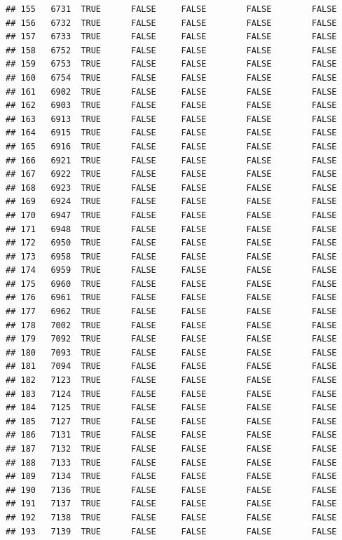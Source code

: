 \documentclass[
  10pt,
  b5paper,
  oneside]{book}
\begin{document}
\begin{verbatim}
## 155   6731  TRUE      FALSE     FALSE        FALSE        FALSE
## 156   6732  TRUE      FALSE     FALSE        FALSE        FALSE
## 157   6733  TRUE      FALSE     FALSE        FALSE        FALSE
## 158   6752  TRUE      FALSE     FALSE        FALSE        FALSE
## 159   6753  TRUE      FALSE     FALSE        FALSE        FALSE
## 160   6754  TRUE      FALSE     FALSE        FALSE        FALSE
## 161   6902  TRUE      FALSE     FALSE        FALSE        FALSE
## 162   6903  TRUE      FALSE     FALSE        FALSE        FALSE
## 163   6913  TRUE      FALSE     FALSE        FALSE        FALSE
## 164   6915  TRUE      FALSE     FALSE        FALSE        FALSE
## 165   6916  TRUE      FALSE     FALSE        FALSE        FALSE
## 166   6921  TRUE      FALSE     FALSE        FALSE        FALSE
## 167   6922  TRUE      FALSE     FALSE        FALSE        FALSE
## 168   6923  TRUE      FALSE     FALSE        FALSE        FALSE
## 169   6924  TRUE      FALSE     FALSE        FALSE        FALSE
## 170   6947  TRUE      FALSE     FALSE        FALSE        FALSE
## 171   6948  TRUE      FALSE     FALSE        FALSE        FALSE
## 172   6950  TRUE      FALSE     FALSE        FALSE        FALSE
## 173   6958  TRUE      FALSE     FALSE        FALSE        FALSE
## 174   6959  TRUE      FALSE     FALSE        FALSE        FALSE
## 175   6960  TRUE      FALSE     FALSE        FALSE        FALSE
## 176   6961  TRUE      FALSE     FALSE        FALSE        FALSE
## 177   6962  TRUE      FALSE     FALSE        FALSE        FALSE
## 178   7002  TRUE      FALSE     FALSE        FALSE        FALSE
## 179   7092  TRUE      FALSE     FALSE        FALSE        FALSE
## 180   7093  TRUE      FALSE     FALSE        FALSE        FALSE
## 181   7094  TRUE      FALSE     FALSE        FALSE        FALSE
## 182   7123  TRUE      FALSE     FALSE        FALSE        FALSE
## 183   7124  TRUE      FALSE     FALSE        FALSE        FALSE
## 184   7125  TRUE      FALSE     FALSE        FALSE        FALSE
## 185   7127  TRUE      FALSE     FALSE        FALSE        FALSE
## 186   7131  TRUE      FALSE     FALSE        FALSE        FALSE
## 187   7132  TRUE      FALSE     FALSE        FALSE        FALSE
## 188   7133  TRUE      FALSE     FALSE        FALSE        FALSE
## 189   7134  TRUE      FALSE     FALSE        FALSE        FALSE
## 190   7136  TRUE      FALSE     FALSE        FALSE        FALSE
## 191   7137  TRUE      FALSE     FALSE        FALSE        FALSE
## 192   7138  TRUE      FALSE     FALSE        FALSE        FALSE
## 193   7139  TRUE      FALSE     FALSE        FALSE        FALSE

\end{verbatim}
\end{document}
